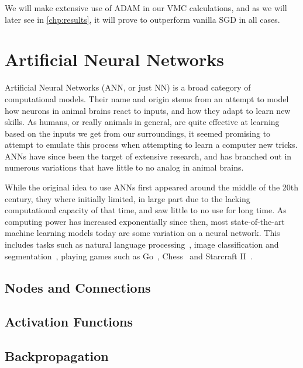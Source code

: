 \documentclass[Thesis.tex]{subfiles}
\begin{document}
We will make extensive use of ADAM in our VMC calculations, and as we will later
see in \cref{chp:results}, it will prove to outperform vanilla SGD in all cases.


\section{Artificial Neural Networks}

Artificial Neural Networks (ANN, or just NN) is a broad category of
computational models. Their name and origin stems from an attempt to model how
neurons in animal brains react to inputs, and how they adapt to learn new
skills. As humans, or really animals in general, are quite effective at learning
based on the inputs we get from our surroundings, it seemed promising to attempt
to emulate this process when attempting to learn a computer new tricks. ANNs
have since been the target of extensive research, and has branched out in
numerous variations that have little to no analog in animal brains.

While the original idea to use ANNs first appeared around the middle of the 20th
century, they where initially limited, in large part due to the lacking
computational capacity of that time, and saw little to no use for long time. As
computing power has increased exponentially since then, most state-of-the-art
machine learning models today are some variation on a neural network. This
includes tasks such as natural language processing~\cite{bert-2018}, image classification and
segmentation~\cite{gpipe-2018}, playing games such as Go~\cite{deepmind-alpha-go-zero},
Chess~\cite{deepmind-alpha-zero} and Starcraft II~\cite{vinyals_babuschkin_chung_mathieu_2019}.

\subsection{Nodes and Connections}

\subsection{Activation Functions}

\subsection{Backpropagation}
\end{document}
